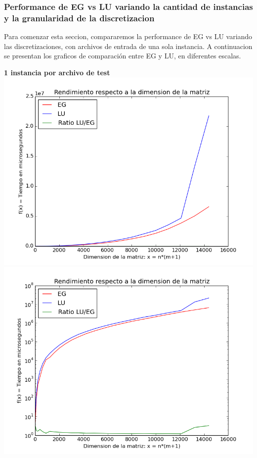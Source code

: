 \subsubsection{Performance de EG vs LU variando la cantidad de instancias y la granularidad de la discretizacion}

Para comenzar esta seccion, compararemos la performance de EG vs LU variando las discretizaciones, con archivos de entrada de una sola instancia. A continuacion se presentan los graficos de comparación entre EG y LU, en diferentes escalas.

\begin{center}
\textbf{1 instancia por archivo de test}\\
\includegraphics[scale=0.35]{experimentos2a_2b/tiempos_nm_fitteo_1_inst/gauss_vs_lu_time_consumed_abs.png}
\includegraphics[scale=0.35]{experimentos2a_2b/tiempos_nm_fitteo_1_inst/gauss_vs_lu_time_consumed_log.png}
\end{center}

